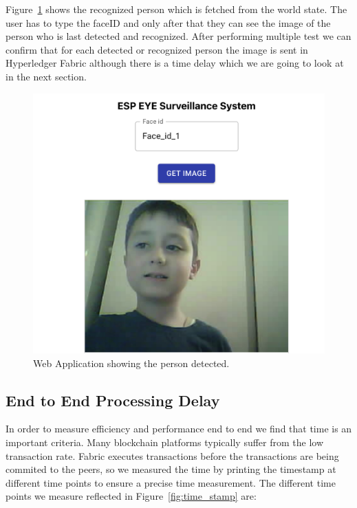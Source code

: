 Figure~\ref{fig:junes} shows the recognized person which is fetched from the world state. The user has to type the faceID and only after that they can see the image of the person who is last detected and recognized. After performing multiple test we can confirm that for each detected or recognized person the image is sent in Hyperledger Fabric although there is a time delay which we are going to look at in the next section. 
\begin{figure}[!htb]
    \centering
    \includegraphics[width=1\textwidth]{figures/junes1.png}
    \caption{Web Application showing the person detected.}
    \label{fig:junes}
\end{figure}


\subsection{End to End Processing Delay}

In order to measure efficiency and performance  end to end we find that time is an important criteria. Many blockchain platforms typically suffer from the low transaction rate. Fabric executes transactions before the transactions are being commited to the peers, so we measured the time by printing the timestamp at different time points to ensure a precise time measurement. 
The different time points we measure reflected in Figure~\ref{fig:time_stamp} are: 


